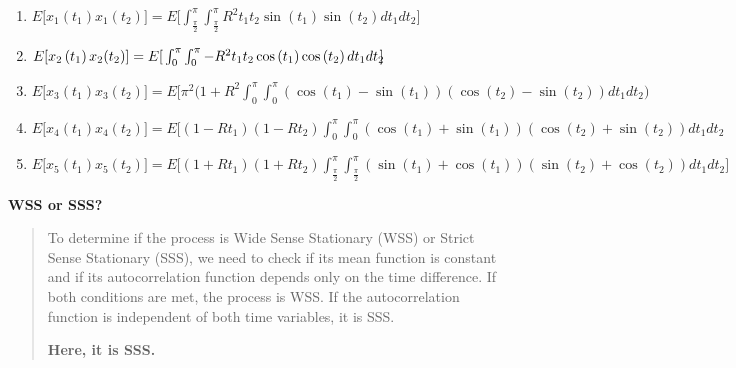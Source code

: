 \documentclass{article}
\begin{document}
\begin{enumerate}
\begin{enumerate}
        \begin{enumerate}
        \def\labelenumii{\roman{enumii}.}
        \item
            \(E\lbrack x_{1}\left( t_{1} \right)x_{1}(t_{2})\rbrack = E\mathbf{\lbrack}\int_{\frac{\pi}{2}}^{\pi}{\int_{\frac{\pi}{2}}^{\pi}{R^{2}t_{1} t_{2}\sin\left( t_{1} \right)\sin\left( t_{2} \right)dt_{1} dt_{2}}}\mathbf{\rbrack}\)
        \item
            \(E\lbrack x_{2}\left( t_{1} \right)x_{2}(t_{2})\rbrack = E\mathbf{\lbrack}\int_{0}^{\pi}{\int_{0}^{\pi}{- R^{2}t_{1} t_{2}\cos\left( t_{1} \right)\cos\left( t_{2} \right)dt_{1} dt_{2}}}\text{\!\!}\mathbf{\rbrack}\)
        \item
            \(E\lbrack x_{3}\left( t_{1} \right)x_{3}(t_{2})\rbrack = E\mathbf{\lbrack}\pi^{2}\mathbf{(}1 + R^{2}\int_{0}^{\pi}{\int_{0}^{\pi}{\left( \cos\left( t_{1} \right) - \sin\left( t_{1} \right) \right)\left( \cos\left( t_{2} \right) - \sin\left( t_{2} \right) \right)dt_{1} dt_{2}\mathbf{)}}}\)
        \item
            \(E\lbrack x_{4}\left( t_{1} \right)x_{4}(t_{2})\rbrack = E\mathbf{\lbrack}\left( 1 - Rt_{1} \right)\left( 1 - Rt_{2} \right)\int_{0}^{\pi}{\int_{0}^{\pi}{\left( \cos\left( t_{1} \right) + \sin\left( t_{1} \right) \right)\left( \cos\left( t_{2} \right) + \sin\left( t_{2} \right) \right)dt_{1} dt_{2}}}\)
        \item
            \(E\lbrack x_{5}\left( t_{1} \right)x_{5}(t_{2})\rbrack = E\mathbf{\lbrack}\left( 1 + Rt_{1} \right)\left( 1 + Rt_{2} \right)\int_{\frac{\pi}{2}}^{\pi}{\int_{\frac{\pi}{2}}^{\pi}{\left( \sin\left( t_{1} \right) + \cos\left( t_{1} \right) \right)\left( \sin\left( t_{2} \right) + \cos\left( t_{2} \right) \right)dt_{1} dt_{2}}}\mathbf{\rbrack}\)
        \end{enumerate}
    \end{enumerate}

    \textbf{WSS or SSS?}

    \begin{quote}
        To determine if the process is Wide Sense Stationary (WSS) or Strict
        Sense Stationary (SSS), we need to check if its mean function is
        constant and if its autocorrelation function depends only on the time
        difference. If both conditions are met, the process is WSS. If the
        autocorrelation function is independent of both time variables, it is
        SSS.

    \textbf{Here, it is SSS.}
    \end{quote}


\end{enumerate}
\end{document}
